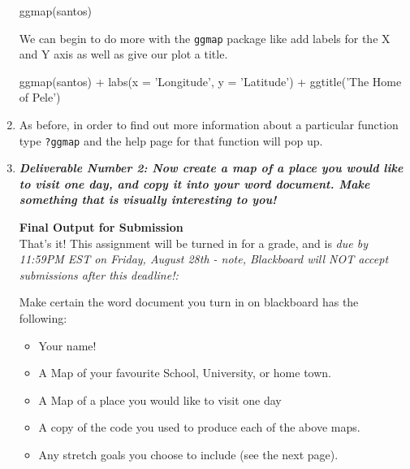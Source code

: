 \documentclass{article}
\newenvironment{Schunk}{}{}
\newcommand{\code}[1]{\texttt{#1}}
\newcommand{\pkg}[1]{\mbox{\texttt{#1}}}
\begin{document}
\begin{enumerate}[leftmargin=15mm]
\begin{Schunk}
\begin{Sinput}

ggmap(santos)

\end{Sinput}
\end{Schunk}

We can begin to do more with the \pkg{ggmap} package like add labels for the X and Y axis as well as give our plot a title.

\begin{Schunk}
\begin{Sinput}

ggmap(santos) + labs(x = 'Longitude', y = 'Latitude') 
+ ggtitle('The Home of Pele')

\end{Sinput}
\end{Schunk}

\item As before, in order to find out more information about a particular function type \code{?ggmap} and the help page for that function will pop up.

\item \textbf{\textit{Deliverable Number 2:  Now create a map of a place you would like to visit one day, and copy it into your word document.  Make something that is visually interesting to you!}}


\vspace{4mm}
\setlength{\leftskip}{1cm}
\newpage
\large{\textbf{Final Output for Submission}}\\
That's it!  This assignment will be turned in for a grade, and is 
\textit{due by 11:59PM EST on Friday, August 28th - note, Blackboard will NOT accept submissions after this deadline!:}

\vspace{2mm}

Make certain the word document you turn in on blackboard has the following:

\begin{itemize}

\item Your name!
\item A Map of your favourite School, University, or home town.
\item A Map of a place you would like to visit one day
\item A copy of the code you used to produce each of the above maps.
\item Any stretch goals you choose to include (see the next page).


\end{itemize}
\end{enumerate}
\end{document}
